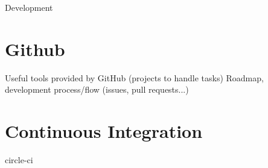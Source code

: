 \begin{chapter}{Development}
    \label{chap:development}

    \section{Github}
    Useful tools provided by GitHub (projects to handle tasks)
    Roadmap, development process/flow (issues, pull requests...)

    \section{Continuous Integration}
    circle-ci

\end{chapter}